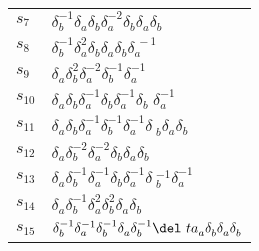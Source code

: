 \documentclass{article}
\begin{document}
\begin{center}
\begin{tabular}{ll}
$s_{7}$ & $\delta_b^{-1}\delta_a^{}\delta_b^{}\delta_a^{-2}\delta_b^{}\delta_a^\
{}\delta_b^{}$ \\
$s_{8}$ & $\delta_b^{-1}\delta_a^{2}\delta_b^{}\delta_a^{}\delta_b^{}\delta_a^{\
-1}$ \\
$s_{9}$ & $\delta_a^{}\delta_b^{2}\delta_a^{-2}\delta_b^{-1}\delta_a^{-1}$ \\
$s_{10}$ & $\delta_a^{}\delta_b^{}\delta_a^{-1}\delta_b^{}\delta_a^{-1}\delta_b\
^{}\delta_a^{-1}$ \\
$s_{11}$ & $\delta_a^{}\delta_b^{}\delta_a^{-1}\delta_b^{-1}\delta_a^{-1}\delta\
_b^{}\delta_a^{}\delta_b^{}$ \\
$s_{12}$ & $\delta_a^{}\delta_b^{-2}\delta_a^{-2}\delta_b^{}\delta_a^{}\delta_b\
^{}$ \\
$s_{13}$ & $\delta_a^{}\delta_b^{-1}\delta_a^{-1}\delta_b^{}\delta_a^{-1}\delta\
_b^{-1}\delta_a^{-1}$ \\
$s_{14}$ & $\delta_a^{}\delta_b^{-1}\delta_a^{2}\delta_b^{2}\delta_a^{}\delta_b\
^{}$ \\
$s_{15}$ & $\delta_b^{-1}\delta_a^{-1}\delta_b^{-1}\delta_a^{}\delta_b^{-1}\del\
ta_a^{}\delta_b^{}\delta_a^{}\delta_b^{}$ \\
\bottomrule
\end{tabular}
\end{center}

\thispagestyle{empty}
\end{document}
